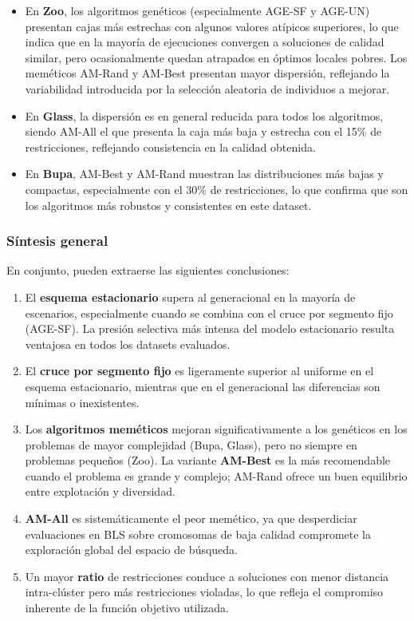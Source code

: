 \documentclass[12pt]{article}
\begin{document}
    \begin{itemize}
        \item En \textbf{Zoo}, los algoritmos genéticos (especialmente AGE-SF y AGE-UN) presentan cajas más estrechas con algunos valores atípicos superiores, lo que indica que en la mayoría de ejecuciones convergen a soluciones de calidad similar, pero ocasionalmente quedan atrapados en óptimos locales pobres. Los meméticos AM-Rand y AM-Best presentan mayor dispersión, reflejando la variabilidad introducida por la selección aleatoria de individuos a mejorar.
    
        \item En \textbf{Glass}, la dispersión es en general reducida para todos los algoritmos, siendo AM-All el que presenta la caja más baja y estrecha con el 15\% de restricciones, reflejando consistencia en la calidad obtenida.
    
        \item En \textbf{Bupa}, AM-Best y AM-Rand muestran las distribuciones más bajas y compactas, especialmente con el 30\% de restricciones, lo que confirma que son los algoritmos más robustos y consistentes en este dataset.
    \end{itemize}
    
    \subsubsection{Síntesis general}
    
    En conjunto, pueden extraerse las siguientes conclusiones:
    
    \begin{enumerate}
        \item El \textbf{esquema estacionario} supera al generacional en la mayoría de escenarios, especialmente cuando se combina con el cruce por segmento fijo (AGE-SF). La presión selectiva más intensa del modelo estacionario resulta ventajosa en todos los datasets evaluados.
    
        \item El \textbf{cruce por segmento fijo} es ligeramente superior al uniforme en el esquema estacionario, mientras que en el generacional las diferencias son mínimas o inexistentes.
    
        \item Los \textbf{algoritmos meméticos} mejoran significativamente a los genéticos en los problemas de mayor complejidad (Bupa, Glass), pero no siempre en problemas pequeños (Zoo). La variante \textbf{AM-Best} es la más recomendable cuando el problema es grande y complejo; AM-Rand ofrece un buen equilibrio entre explotación y diversidad.
    
        \item \textbf{AM-All} es sistemáticamente el peor memético, ya que desperdiciar evaluaciones en BLS sobre cromosomas de baja calidad compromete la exploración global del espacio de búsqueda.
    
        \item Un mayor \textbf{ratio} de restricciones conduce a soluciones con menor distancia intra-clúster pero más restricciones violadas, lo que refleja el compromiso inherente de la función objetivo utilizada.
    \end{enumerate}
\end{document}
